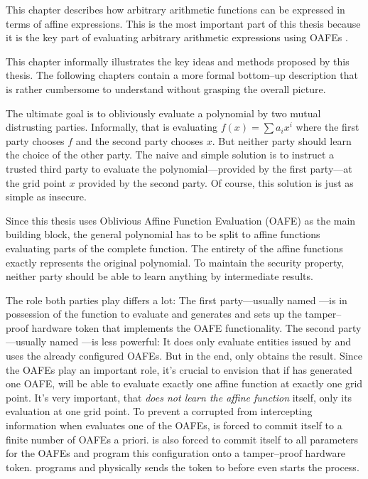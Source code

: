 \label{sec:methods}

This chapter describes how arbitrary arithmetic functions can be expressed in
terms of affine expressions. This is the most important part of this thesis
because it is the key part of evaluating arbitrary arithmetic expressions
using OAFEs \cite{davidgoliath}.


%
%
\label{sec:illustration}

This chapter informally illustrates the key ideas and methods proposed by this
thesis. The following chapters contain a more formal bottom--up description that
is rather cumbersome to understand without grasping the overall picture.

The ultimate goal is to obliviously evaluate a polynomial by two mutual
distrusting parties. Informally, that is evaluating $f(x) = \sum a_ix^i$ where
the first party chooses $f$ and the second party chooses $x$. But neither
party should learn the choice of the other party. The naive and simple solution
is to instruct a trusted third party to evaluate the polynomial---provided by
the first party---at the grid point $x$ provided by the second party.
Of course, this solution is just as simple as insecure.

Since this thesis uses Oblivious Affine Function Evaluation
(OAFE)\cite{davidgoliath} as the main building block, the general polynomial has
to be split to affine functions evaluating parts of the complete function. The
entirety of the affine functions exactly represents the original polynomial. To
maintain the security property, neither party should be able to learn anything
by intermediate results.

The role both parties play differs a lot: The first party---usually named
\JWpOne{}---is in possession of the function to evaluate and generates and sets
up the tamper--proof hardware token that implements the OAFE functionality. The
second party---usually named \JWpTwo{}---is less powerful: It does only evaluate
entities issued by \JWpOne{} and uses the already configured OAFEs. But in the
end, only \JWpTwo{} obtains the result.  Since the OAFEs play an important role,
it's crucial to envision that if \JWpOne{} has generated one OAFE, \JWpTwo{}
will be able to evaluate exactly one affine function at exactly one grid point.
It's very important, that \JWpTwo{} \emph{does not learn the affine function}
itself, only its evaluation at one grid point. To prevent a corrupted \JWpOne{}
from intercepting information when \JWpTwo{} evaluates one of the OAFEs,
\JWpOne{} is forced to commit itself to a finite number of OAFEs a priori.
\JWpOne{} is also forced to commit itself to all parameters for the OAFEs and
program this configuration onto a tamper--proof hardware token. \JWpOne{}
programs and physically sends the token to \JWpTwo{} before \JWpTwo{} even
starts the process.

